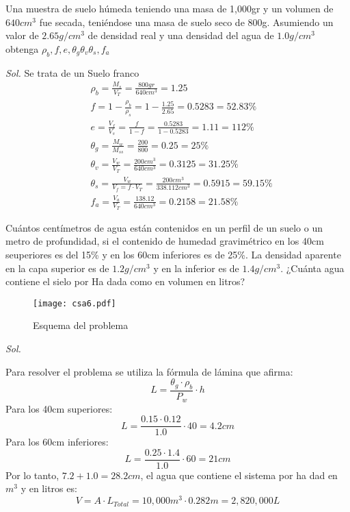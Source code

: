 \begin{problem}
    Una muestra de suelo húmeda teniendo una masa de 1,000gr y un volumen de $640cm^3$ fue secada, teniéndose una masa de suelo seco de 800g. Asumiendo un valor de $2.65g/cm^3$ de densidad real y una densidad del agua de $1.0g/cm^3$ obtenga $\rho_b,f,e,\theta_g\theta_v\theta_s,f_a$
\end{problem}

\textit{ Sol. }
Se trata de un Suelo franco
\begin{align*}
    &\rho_b = \frac{M_s}{V_T} =\frac{800gr}{640cm^3} = 1.25\\
    &f =1 - \frac{\rho_b}{\rho_s} = 1 -\frac{1.25}{2.65} = 0.5283=52.83\%\\
    &e = \frac{V_f}{V_s} =\frac{f}{1 - f} =\frac{0.5283}{1 -0.5283} = 1.11 = 112\%\\
    &\theta_g = \frac{M_w}{M_{ss}} = \frac{200}{800} = 0.25 = 25\%\\
    &\theta_v = \frac{V_w}{V_T} = \frac{200cm^3}{640cm^3} =0.3125 = 31.25\%\\
    &\theta_s = \frac{V_w}{V_f = f\cdot V_T} = \frac{200cm^3}{338.112cm^3} = 0.5915 = 59.15\%\\
    &f_a = \frac{V_a}{V_T} = \frac{138.12}{640cm^3} = 0.2158 = 21.58\%
\end{align*}
\begin{example}
    Cuántos centímetros de agua están contenidos en un perfil de un suelo o un metro de profundidad, si el contenido de humedad gravimétrico en los 40cm seuperiores es del 15\% y en los 60cm inferiores es de 25\%. La densidad aparente en la capa superior es de $1.2 g/cm^3$ y en la inferior es de $1.4g/cm^3$. ¿Cuánta agua contiene el sielo por Ha dada como en volumen en litros?
\end{example}
\begin{figure}[h!]
\centering
  \texttt{[image: csa6.pdf]}
  \caption{Esquema del problema}
  \label{cas6}
\end{figure}
\textit{ Sol. }

Para resolver el problema se utiliza la fórmula de lámina que afirma:
\begin{equation*}
    L= \frac{\theta_g\cdot \rho_b}{P_w}\cdot h
\end{equation*}
Para los 40cm superiores:
\begin{equation*}
    L =\frac{0.15 \cdot 0.12}{1.0} \cdot 40 = 4.2cm
\end{equation*}
Para los 60cm inferiores:
\begin{equation*}
    L = \frac{0.25 \cdot 1.4}{1.0} \cdot 60 = 21cm
\end{equation*}
Por lo tanto, $7.2 + 1.0 = 28.2cm$, el agua que contiene el sistema por ha dad en $m^3$ y en litros es:
\begin{equation*}
    V =A \cdot L_{Total} = 10,000m^3 \cdot 0.282m = 2,820,000L
\end{equation*}

